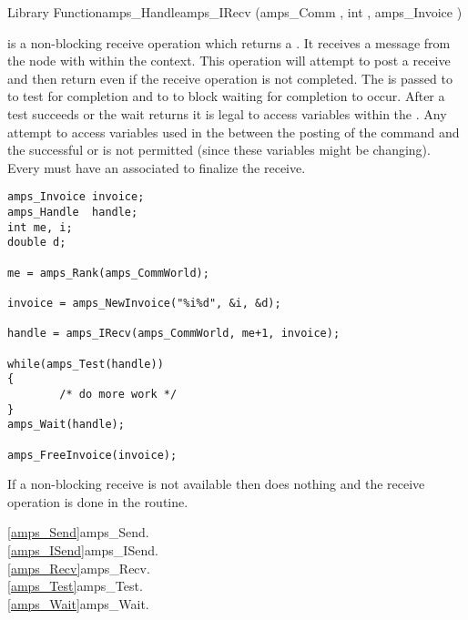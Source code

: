 \begin{deftypefn}{Library Function}{amps_Handle}{amps\_IRecv}
(amps_Comm , int , amps_Invoice ) 

\DESCRIPTION

 is a non-blocking receive operation which returns a
.  It receives a message from the node with 
within the  context.  This operation will attempt to post a
receive and then return even if the receive operation is not completed.
The  is passed to  to test for completion
and to  to block waiting for completion to occur.
After a test succeeds or the wait returns it is legal to access
variables within the .  Any attempt to access variables
used in the  between the posting of the 
command and the successful  or  is not
permitted (since these variables might be changing).  Every  
must have an associated  to finalize the receive.


\EXAMPLE

\begin{display}\begin{verbatim}
amps_Invoice invoice;
amps_Handle  handle;
int me, i;
double d;

me = amps_Rank(amps_CommWorld);

invoice = amps_NewInvoice("%i%d", &i, &d);

handle = amps_IRecv(amps_CommWorld, me+1, invoice);

while(amps_Test(handle))
{
        /* do more work */
}
amps_Wait(handle);

amps_FreeInvoice(invoice);
\end{verbatim}\end{display}

\NOTES

If a non-blocking receive is not available then  does
nothing and the receive operation is done in the 
routine.

\SEEALSO
\vref{amps_Send}{amps\_Send}. \\
\vref{amps_ISend}{amps\_ISend}. \\
\vref{amps_Recv}{amps\_Recv}. \\
\vref{amps_Test}{amps\_Test}. \\
\vref{amps_Wait}{amps\_Wait}. \\

\end{deftypefn}

